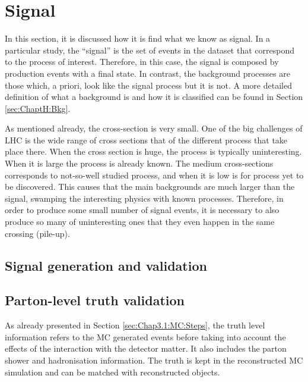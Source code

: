 \section{Signal}
\label{sec:ChaptH:Sig}
In this section, it is discussed how it is find what we know as signal. In a particular study, the ``signal''
is the set of events in the dataset that correspond to the process of interest. Therefore, in this case, the 
signal is composed by \tHq production events with a \dileptau  final state. In contrast, the background 
processes are those which, a priori, look like the signal process but it is not. A more detailed definition 
of what a background is and how it is classified can be found in Section \ref{sec:ChaptH:Bkg}.

As mentioned already, the \tHq cross-section is very small. 
One of the big challenges of LHC is the wide range of cross sections that
of the different process that take place there. When the cross section
is huge, the process is typically uninteresting. When it is large the process
is already known. The medium cross-sections corresponds to not-so-well
studied process, and when it is low is for process yet to be discovered.
This causes that the main backgrounds are much larger than the signal,
swamping the interesting physics with known processes. Therefore, in order
to produce some small number of signal events, it is necessary to also produce
so many of uninteresting ones that they even happen in the same crossing (pile-up).


\subsection{Signal generation and validation}
\label{sec:ChaptH:Sig:GenerationValidation}

\subsection{Parton-level truth validation}
\label{sec:ChaptH:Sig:truth}
As already presented in Section \ref{sec:Chap3.1:MC:Steps}, the truth level 
information refers to the MC generated events before taking into account
the effects of the interaction with the detector matter. It also includes
the parton shower and hadronisation information. The truth is kept in the 
reconstructed MC simulation and can be matched with reconstructed objects.

